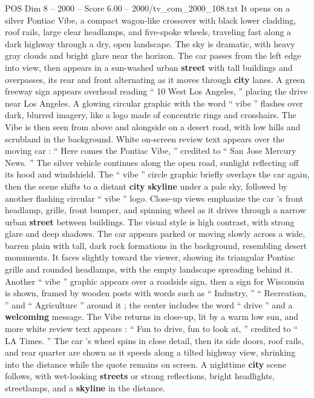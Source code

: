 \begin{textsample}{POS Dim 8 – 2000 – Score 6.00 – 2000/tv\_com\_2000\_108.txt}  \label{ex:f8_pos_017}
It opens on a silver Pontiac Vibe, a compact wagon-like crossover with black lower cladding, roof rails, large clear headlamps, and five-spoke wheels, traveling fast along a dark highway through a dry, open landscape.
The sky is dramatic, with heavy gray clouds and bright glare near the horizon.
The car passes from the left edge into view, then appears in a sun-washed urban \textbf{street} with tall buildings and overpasses, its rear and front alternating as it moves through \textbf{city} lanes.
A green freeway sign appears overhead reading “ 10 West Los Angeles, ” placing the drive near Los Angeles.
A glowing circular graphic with the word “ vibe ” flashes over dark, blurred imagery, like a logo made of concentric rings and crosshairs.
The Vibe is then seen from above and alongside on a desert road, with low hills and scrubland in the background.
White on-screen review text appears over the moving car : “ Here comes the Pontiac Vibe, ” credited to “ San Jose Mercury News. ” The silver vehicle continues along the open road, sunlight reflecting off its hood and windshield.
The “ vibe ” circle graphic briefly overlays the car again, then the scene shifts to a distant \textbf{city} \textbf{skyline} under a pale sky, followed by another flashing circular “ vibe ” logo.
Close-up views emphasize the car ’s front headlamp, grille, front bumper, and spinning wheel as it drives through a narrow urban \textbf{street} between buildings.
The visual style is high contrast, with strong glare and deep shadows.
The car appears parked or moving slowly across a wide, barren plain with tall, dark rock formations in the background, resembling desert monuments.
It faces slightly toward the viewer, showing its triangular Pontiac grille and rounded headlamps, with the empty landscape spreading behind it.
Another “ vibe ” graphic appears over a roadside sign, then a sign for Wisconsin is shown, framed by wooden posts with words such as “ Industry, ” “ Recreation, ” and “ Agriculture ” around it ; the center includes the word “ drive ” and a \textbf{welcoming} message.
The Vibe returns in close-up, lit by a warm low sun, and more white review text appears : “ Fun to drive, fun to look at, ” credited to “ LA Times. ” The car ’s wheel spins in close detail, then its side doors, roof rails, and rear quarter are shown as it speeds along a tilted highway view, shrinking into the distance while the quote remains on screen.
A nighttime \textbf{city} scene follows, with wet-looking \textbf{streets} or strong reflections, bright headlights, streetlamps, and a \textbf{skyline} in the distance.

\end{textsample}
